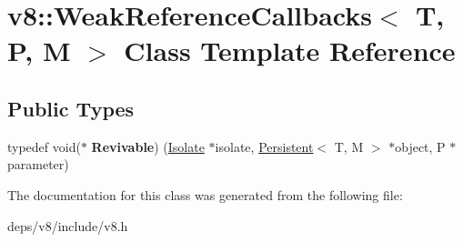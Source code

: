 \hypertarget{classv8_1_1_weak_reference_callbacks}{}\section{v8\+:\+:Weak\+Reference\+Callbacks$<$ T, P, M $>$ Class Template Reference}
\label{classv8_1_1_weak_reference_callbacks}
\subsection*{Public Types}
\begin{DoxyCompactItemize}
\item 
\hypertarget{classv8_1_1_weak_reference_callbacks_a20a8de1a52d04154f56d745186f83fe2}{}typedef void($\ast$ {\bfseries Revivable}) (\hyperlink{classv8_1_1_isolate}{Isolate} $\ast$isolate, \hyperlink{classv8_1_1_persistent}{Persistent}$<$ T, M $>$ $\ast$object, P $\ast$parameter)\label{classv8_1_1_weak_reference_callbacks_a20a8de1a52d04154f56d745186f83fe2}

\end{DoxyCompactItemize}


The documentation for this class was generated from the following file\+:\begin{DoxyCompactItemize}
\item 
deps/v8/include/v8.\+h\end{DoxyCompactItemize}
